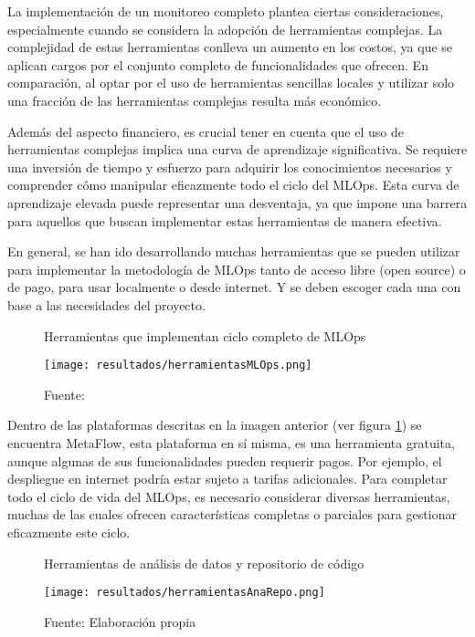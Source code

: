 \newpage

La implementación de un monitoreo completo plantea ciertas consideraciones, especialmente cuando se considera la adopción de herramientas complejas. La complejidad de estas herramientas conlleva un aumento en los costos, ya que se aplican cargos por el conjunto completo de funcionalidades que ofrecen. En comparación, al optar por el uso de herramientas sencillas locales y utilizar solo una fracción de las herramientas complejas resulta más económico.

Además del aspecto financiero, es crucial tener en cuenta que el uso de herramientas complejas implica una curva de aprendizaje significativa. Se requiere una inversión de tiempo y esfuerzo para adquirir los conocimientos necesarios y comprender cómo manipular eficazmente todo el ciclo del MLOps. Esta curva de aprendizaje elevada puede representar una desventaja, ya que impone una barrera para aquellos que buscan implementar estas herramientas de manera efectiva.

En general, se han ido desarrollando muchas herramientas que se pueden utilizar para implementar la metodología de MLOps tanto de acceso libre (open source) o de pago, para usar localmente o desde internet. Y se deben escoger cada una con base a las necesidades del proyecto.

\begin{figure}[h]
	\centering
	\caption{Herramientas que implementan ciclo completo de MLOps}
	\texttt{[image: resultados/herramientasMLOps.png]}
	\caption*{\footnotesize Fuente: \cite{neptune2024}}
	\label{fig:figuraHerramientasMLOps}
\end{figure}

\newpage

Dentro de las plataformas descritas en la imagen anterior (ver figura \ref{fig:figuraHerramientasMLOps}) se encuentra MetaFlow, esta plataforma en sí misma, es una herramienta gratuita, aunque algunas de sus funcionalidades pueden requerir pagos. Por ejemplo, el despliegue en internet podría estar sujeto a tarifas adicionales. Para completar todo el ciclo de vida del MLOps, es necesario considerar diversas herramientas, muchas de las cuales ofrecen características completas o parciales para gestionar eficazmente este ciclo.

\begin{figure}[h]
	\centering
	\caption{Herramientas de análisis de datos y repositorio de código}
	\texttt{[image: resultados/herramientasAnaRepo.png]}
	\caption*{\footnotesize Fuente: Elaboración propia}
	\label{fig:figuraHerramientasAnaRepo}
\end{figure}

